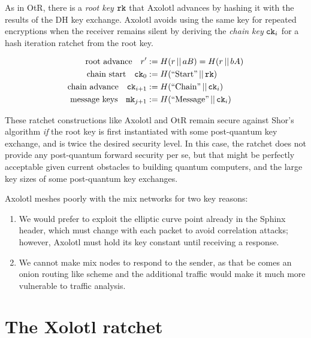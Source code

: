 \documentclass[twoside,letterpaper]{llncs}
\def\mathcomma{}
\begin{document}
As in OtR, there is a {\it root key} $\texttt{rk}$ that Axolotl advances by
hashing it with the results of the DH key exchange.  Axolotl avoids using the same key for
repeated encryptions when the receiver remains silent by deriving the
{\it chain key} $\texttt{ck}_i$ for a hash iteration ratchet from the root key.

\[ \begin{aligned}
\textrm{root advance}\quad
r' &:= H(r \,||\, a B) = H(r \,||\, b A) \\ %
\textrm{chain start}\quad
 \ck_0 &:= H(\textrm{``Start''} \,||\, \rk) \\
\textrm{chain advance}\quad
 \ck_{i+1} &:= H(\textrm{``Chain''} \,||\, \ck_i)  \\
\textrm{message keys}\quad
 \mk_{j+1} &:= H(\textrm{``Message''} \,||\, \ck_i)  \\
\end{aligned} \]

These ratchet constructions like Axolotl and OtR remain secure against
Shor's algorithm {\it if} the root key is first instantiated with some
post-quantum key exchange, and is twice the desired security level. 
In this case, the ratchet does not provide any post-quantum forward
security per se, but that might be perfectly acceptable given current
obstacles to building quantum computers, and the large key sizes of
some post-quantum key exchanges. 


Axolotl meshes poorly with the mix networks for two key reasons:
\begin{enumerate}
 \item
 We would prefer to exploit the elliptic curve point
 already in the Sphinx header, which must change with each packet
 to avoid correlation attacks; 
 however, Axolotl must hold its key constant until receiving a response.
 \item
 We cannot make mix nodes to respond to the sender, as that
 be comes an onion routing like scheme and the additional traffic
 would make it much more vulnerable to traffic analysis.
\end{enumerate}


\section{The Xolotl ratchet}

\def\cn{\texttt{cn}}
\def\DH{\texttt{DH}}
\def\lk{\texttt{lk}}
\def\sk{\texttt{sk}}
\def\ECDH{\textrm{ECDH}}
\end{document}
